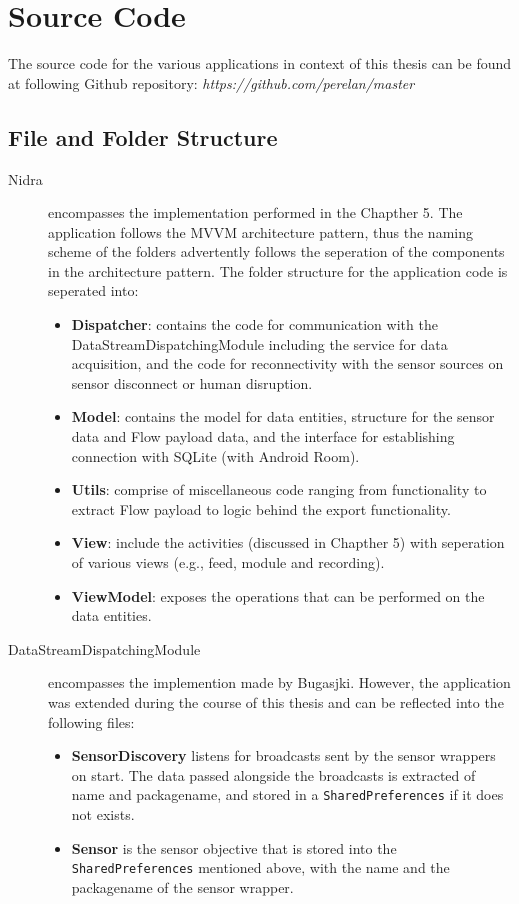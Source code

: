 \chapter{Source Code}
The source code for the various applications in context of this thesis can be found at following Github repository: \textit{https://github.com/perelan/master}

\section{File and Folder Structure}
\begin{description}
    \item[Nidra] encompasses the implementation performed in the Chapther 5. The application follows the MVVM architecture pattern, thus the naming scheme of the folders advertently follows the seperation of the components in the architecture pattern. The folder structure for the application code is seperated into:
    \begin{itemize}
        \item \textbf{Dispatcher}: contains the code for communication with the DataStreamDispatchingModule including the service for data acquisition, and the code for reconnectivity with the sensor sources on sensor disconnect or human disruption.
        \item \textbf{Model}: contains the model for data entities, structure for the sensor data and Flow payload data, and the interface for establishing connection with SQLite (with Android Room).
        \item \textbf{Utils}: comprise of miscellaneous code ranging from functionality to extract Flow payload to logic behind the export functionality. 
        \item \textbf{View}: include the activities (discussed in Chapther 5) with seperation of various views (e.g., feed, module and recording). 
        \item \textbf{ViewModel}: exposes the operations that can be performed on the data entities. 
    \end{itemize}

    \item[DataStreamDispatchingModule] encompasses the implemention made by Bugasjki. However, the application was extended during the course of this thesis and can be reflected into the following files: 
    \begin{itemize}
        \item \textbf{SensorDiscovery} listens for broadcasts sent by the sensor wrappers on start. The data passed alongside the broadcasts is extracted of name and packagename, and stored in a \verb|SharedPreferences| if it does not exists. 
        \item \textbf{Sensor} is the sensor objective that is stored into the \verb|SharedPreferences| mentioned above, with the name and the packagename of the sensor wrapper. 
    \end{itemize}


\end{description}

